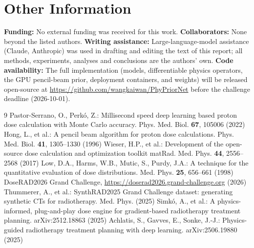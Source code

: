 \documentclass{llncs}
\begin{document}
\section{Other Information}
\textbf{Funding:} No external funding was received for this work.
\textbf{Collaborators:} None beyond the listed authors.
\textbf{Writing assistance:} Large-language-model assistance (Claude, Anthropic) was used in drafting and editing the text of this report; all methods, experiments, analyses and conclusions are the authors' own.
\textbf{Code availability:} The full implementation (models, differentiable physics operators,
the GPU pencil-beam prior, deployment containers, and weights) will be released open-source at
\url{https://github.com/wangkaiwan/PhyPriorNet} before the challenge deadline (2026-10-01).

\clearpage
\begin{thebibliography}{9}\small
{} Pastor-Serrano, O., Perk\'o, Z.: Millisecond speed deep learning based proton dose
calculation with Monte Carlo accuracy. Phys. Med. Biol. \textbf{67}, 105006 (2022)
 Hong, L., et al.: A pencil beam algorithm for proton dose calculations. Phys. Med.
Biol. \textbf{41}, 1305--1330 (1996)
 Wieser, H.P., et al.: Development of the open-source dose calculation and
optimization toolkit matRad. Med. Phys. \textbf{44}, 2556--2568 (2017)
 Low, D.A., Harms, W.B., Mutic, S., Purdy, J.A.: A technique for the quantitative
evaluation of dose distributions. Med. Phys. \textbf{25}, 656--661 (1998)
 DoseRAD2026 Grand Challenge, \url{https://doserad2026.grand-challenge.org} (2026)
 Thummerer, A., et al.: SynthRAD2025 Grand Challenge dataset: generating
synthetic CTs for radiotherapy. Med. Phys. (2025)
 Simk\'o, A., et al.: A physics-informed, plug-and-play dose engine for
gradient-based radiotherapy treatment planning. arXiv:2512.18863 (2025)
 Achlatis, S., Gavves, E., Sonke, J.-J.: Physics-guided radiotherapy treatment
planning with deep learning. arXiv:2506.19880 (2025)
\end{thebibliography}
\end{document}
